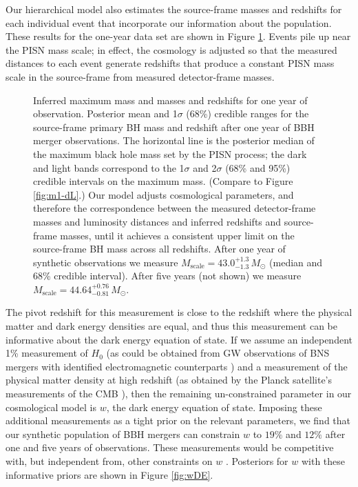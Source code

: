 \documentclass[modern]{aastex62}
\newcommand{\MScale}{M_{\mathrm{scale}}}
\newcommand{\MScaleOneYear}{43.0^{+1.3}_{-1.3} \, \MSun{}}
\newcommand{\MScaleFiveYear}{44.64^{+0.76}_{-0.81} \, \MSun{}}
\newcommand{\SigmawDEOneYear}{19 \%}
\newcommand{\SigmawDEFiveYear}{12 \%}
\newcommand{\MSun}{M_\odot}
\begin{document}
Our hierarchical model also estimates the source-frame masses and redshifts for
each individual event that incorporate our information about the population.
These results for the one-year data set are shown in Figure
\ref{fig:mass-correction}.  Events pile up near the \ac{PISN} mass scale; in
effect, the cosmology is adjusted so that the measured distances to each event
generate redshifts that produce a constant \ac{PISN} mass scale in the
source-frame from measured detector-frame masses.

\begin{figure}
%
  \caption{\label{fig:mass-correction} Inferred maximum mass and masses and
  redshifts for one year of observation.  Posterior mean and 1$\sigma$ (68\%)
  credible ranges for the source-frame primary \ac{BH} mass and redshift after
  one year of \ac{BBH} merger observations.  The horizontal line is the
  posterior median of the maximum black hole mass set by the PISN process; the
  dark and light bands correspond to the 1$\sigma$ and 2$\sigma$ (68\% and 95\%)
  credible intervals on the maximum mass.  (Compare to Figure \ref{fig:m1-dL}.)
  Our model adjusts cosmological parameters, and therefore the correspondence
  between the measured detector-frame masses and luminosity distances and
  inferred redshifts and source-frame masses, until it achieves a consistent
  upper limit on the source-frame \ac{BH} mass across all redshifts.  After one
  year of synthetic observations we measure $\MScale{} = \MScaleOneYear{}$ (median
  and 68\% credible interval).  After five years (not shown) we measure $\MScale{}
  = \MScaleFiveYear{}$.}
%
\end{figure}

The pivot redshift for this measurement is close to the redshift where the
physical matter and dark energy densities are equal, and thus this measurement
can be informative about the dark energy equation of state.  If we assume an
independent 1\% measurement of $H_0$ (as could be obtained from \ac{GW}
observations of \ac{BNS} mergers with identified electromagnetic counterparts
\citep{Chen2017}) and a measurement of the physical matter density at high
redshift (as obtained by the Planck satellite's measurements of the \ac{CMB}
\citep{Planck2016}), then the remaining un-constrained parameter in our
cosmological model is $w$, the dark energy equation of state.  Imposing these
additional measurements as a tight prior on the relevant parameters, we find
that our synthetic population of \ac{BBH} mergers can constrain $w$ to
$\SigmawDEOneYear{}$ and $\SigmawDEFiveYear{}$ after one and five years of
observations.  These measurements would be competitive with, but independent
from, other constraints on $w$ \citep[e.g., see][]{2019PhRvL.122q1301A}.  Posteriors for $w$ with these
informative priors are shown in Figure \ref{fig:wDE}.
\end{document}
